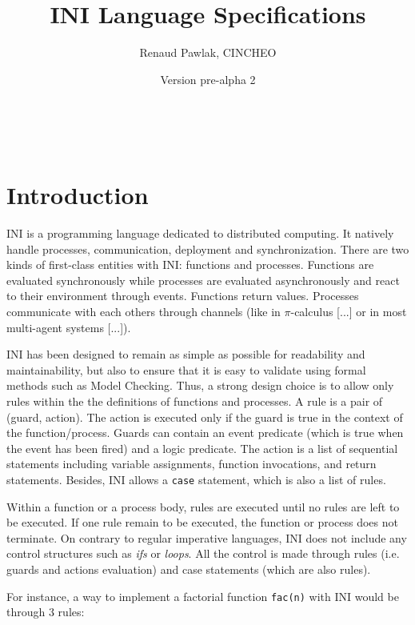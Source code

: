 \documentclass[11pt]{report}
\begin{document}
\thispagestyle{empty}

\title{INI Language Specifications}
\author{Renaud Pawlak, CINCHEO}

\date{Version pre-alpha 2}
\maketitle
\

\tableofcontents

\chapter*{Introduction}

INI is a programming language dedicated to distributed computing. It natively handle processes, communication, deployment and synchronization. There are two kinds of first-class entities with INI: functions and processes. Functions are evaluated synchronously while processes are evaluated asynchronously and react to their environment through events. Functions return values. Processes communicate with each others through channels (like in $\pi$-calculus [...] or in most multi-agent systems [...]).

INI has been designed to remain as simple as possible for readability and maintainability, but also to ensure that it is easy to validate using formal methods such as Model Checking. Thus, a strong design choice is to allow only rules within the the definitions of functions and processes. A rule is a pair of (guard, action). The action is executed only if the guard is true in the context of the function/process. Guards can contain an event predicate (which is true when the event has been fired) and a logic predicate. The action is a list of sequential statements including variable assignments, function invocations, and return statements. Besides, INI allows a \texttt{case} statement, which is also a list of rules.

Within a function or a process body, rules are executed until no rules are left to be executed. If one rule remain to be executed, the function or process does not terminate. On contrary to regular imperative languages, INI does not include any control structures such as \emph{ifs} or \emph{loops}. All the control is made through rules (i.e. guards and actions evaluation) and case statements (which are also rules).

For instance, a way to implement a factorial function \texttt{fac(n)} with INI would be through 3 rules:
\end{document}
